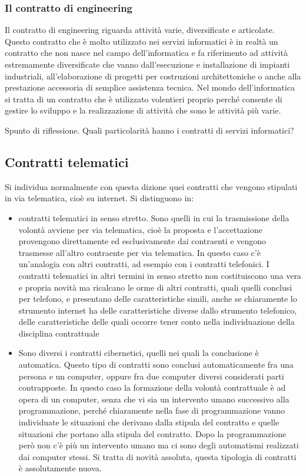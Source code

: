 \subsubsection{Il contratto di engineering}

Il contratto di engineering riguarda attività varie, diversificate e articolate. Questo contratto che è molto utilizzato nei servizi informatici è in realtà un contratto che non nasce nel campo dell'informatica e fa riferimento ad attività estremamente diversificate che vanno dall'esecuzione e installazione di impianti industriali, all'elaborazione di progetti per costruzioni architettoniche o anche alla prestazione accessoria di semplice assistenza tecnica. 
Nel mondo dell'informatica si tratta di un contratto che è utilizzato volentieri proprio perché consente di gestire lo sviluppo e la realizzazione di attività che sono le attività più varie. 

Spunto di riflessione. Quali particolarità hanno i contratti di servizi informatici? 

\subsection{Contratti telematici} 

Si individua normalmente con questa dizione quei contratti che vengono stipulati in via telematica, cioè su internet. Si distinguono in:

\begin{itemize}
    \item contratti telematici in senso stretto. Sono quelli in cui la trasmissione della volontà avviene per via telematica, cioè la proposta e l'accettazione provengono direttamente ed esclusivamente dai contraenti e vengono trasmesse all'altro contraente per via telematica. In questo caso c'è un'analogia con altri contratti, ad esempio con i contratti telefonici. I contratti telematici in altri termini in senso stretto non costituiscono una vera e propria novità ma ricalcano le orme di altri contratti, quali quelli conclusi per telefono, e presentano delle caratteristiche simili, anche se chiaramente lo strumento internet ha delle caratteristiche diverse dallo strumento telefonico, delle caratteristiche delle quali occorre tener conto nella individuazione della disciplina contrattuale
    \item Sono diversi i contratti cibernetici, quelli nei quali la conclusione è automatica. Questo tipo di contratti sono conclusi automaticamente fra una persona e un computer, oppure fra due computer diversi considerati parti contrapposte. In questo caso la formazione della volontà contrattuale è ad opera di un computer, senza che vi sia un intervento umano successivo alla programmazione, perché chiaramente nella fase di programmazione vanno individuate le situazioni che derivano dalla stipula del contratto e quelle situazioni che portano alla stipula del contratto. Dopo la programmazione però non c'è più un intervento umano ma ci sono degli automatismi realizzati dai computer stessi. Si tratta di novità assoluta, questa tipologia di contratti è assolutamente nuova.
\end{itemize}

